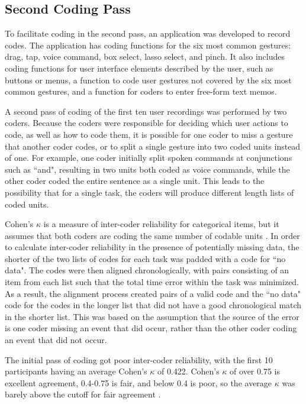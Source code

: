\subsection{Second Coding Pass} \label{section:Second_Coding_Pass}

To facilitate coding in the second pass, an application was developed to record codes. 
The application has coding functions for the six most common gestures: drag, tap, voice command, box select, lasso select, and pinch. 
It also includes coding functions for user interface elements described by the user, such as buttons or menus, a function to code user gestures not covered by the six most common gestures, and a function for coders to enter free-form text memos. 

A second pass of coding of the first ten user recordings was performed by two coders. 
Because the coders were responsible for deciding which user actions to code, as well as how to code them, it is possible for one coder to miss a gesture that another coder codes, or to split a single gesture into two coded units instead of one. 
For example, one coder initially split spoken commands at conjunctions such as ``and", resulting in two units both coded as voice commands, while the other coder coded the entire sentence as a single unit. 
This leads to the possibility that for a single task, the coders will produce different length lists of coded units. 

Cohen's $\kappa$ is a measure of inter-coder reliability for categorical items, but it assumes that both coders are coding the same number of codable units \citep{cohen1960coefficient}. 
In order to calculate inter-coder reliability in the presence of potentially missing data, the  shorter of the two lists of codes for each task was padded with a code for ``no data". 
The codes were then aligned chronologically, with pairs consisting of an item from each list such that the total time error within the task was minimized.
As a result, the alignment process created pairs of a valid code and the ``no data" code for the codes in the longer list that did not have a good chronological match in the shorter list.
This was based on the assumption that the source of the error is one coder missing an event that did occur, rather than the other coder coding an event that did not occur. 

The initial pass of coding got poor inter-coder reliability, with the first 10 participants having an average Cohen's $\kappa$ of 0.422. %
Cohen's $\kappa$ of over 0.75 is excellent agreement, 0.4-0.75 is fair, and below 0.4 is poor, so the average $\kappa$ was barely above the cutoff for fair agreement \citep{Fleiss_stats_methods}. 


